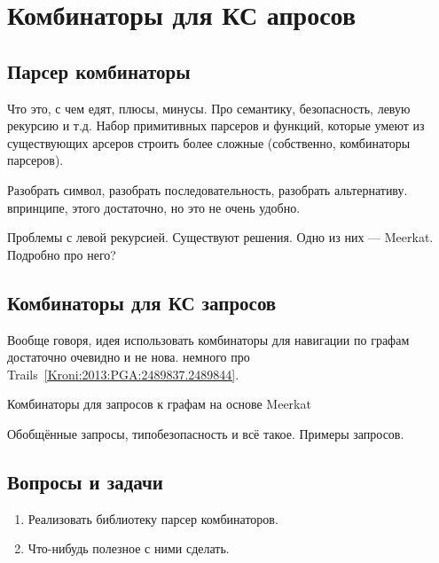 \section{Комбинаторы для КС апросов}

\subsection{Парсер комбинаторы}

Что это, с чем едят, плюсы, минусы. Про семантику, безопасность, левую рекурсию и т.д.
Набор примитивных парсеров и функций, которые умеют из существующих арсеров строить более сложные (собственно, комбинаторы парсеров).

Разобрать символ, разобрать последовательность, разобрать альтернативу. впринципе, этого достаточно, но это не очень удобно.

Проблемы с левой рекурсией.
Существуют решения. Одно из них --- Meerkat.
Подробно про него?

\subsection{Комбинаторы для КС запросов}

Вообще говоря, идея использовать комбинаторы для навигации по графам достаточно очевидно и не нова.
немного про Trails~\ref{Kroni:2013:PGA:2489837.2489844}.

Комбинаторы для запросов к графам на основе Meerkat~\cite{Verbitskaia:2018:PCC:3241653.3241655}

Обобщённые запросы, типобезопасность и всё такое.
Примеры запросов.

\subsection{Вопросы и задачи}
\begin{enumerate}
  \item Реализовать библиотеку парсер комбинаторов.
  \item Что-нибудь полезное с ними сделать.
\end{enumerate}
